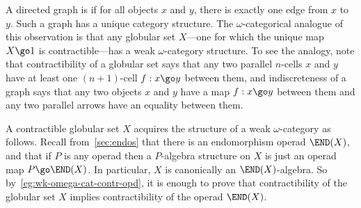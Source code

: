 \begin{example}	
A directed graph is %
%
%
if for all objects $x$ and $y$,
there is exactly one edge from $x$ to $y$.  Such a graph has a unique
category%
%
%
structure.  The $\omega$-categorical analogue of this observation
is that any %
%
%
%
%
%
globular set $X$---one for which the
unique map $X \go 1$ is contractible---has a weak $\omega$-category
structure.  To see the analogy, note that contractibility of a globular set
says that any two parallel $n$-cells $x$ and $y$ have at least one
$(n+1)$-cell $f: x \go y$ between them, and indiscreteness of a graph says
that any two objects $x$ and $y$ have a map $f: x \go y$ between them and
any two parallel arrows have an equality between them.

A contractible globular set $X$ acquires the structure of a weak
$\omega$-category as follows.  Recall from~\ref{sec:endos} that there is an
endomorphism%
%
%
%
%
%
%
%
%
operad $\END(X)$, and that if $P$ is any operad then a
$P$-algebra structure on $X$ is just an operad map $P \go \END(X)$.  In
particular, $X$ is canonically an $\END(X)$-algebra.  So
by~\ref{eg:wk-omega-cat-contr-opd}, it is enough to prove that
contractibility of the globular set $X$ implies contractibility of the
operad $\END(X)$.  


\end{example}
